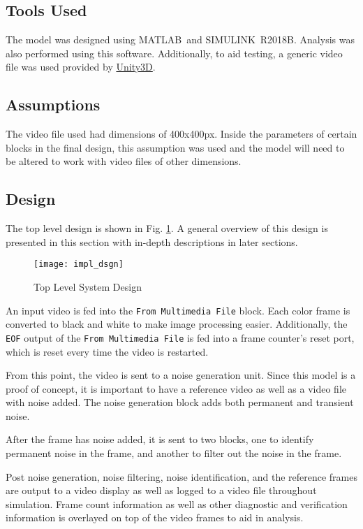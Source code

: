 \subsection{Tools Used}
The model was designed using MATLAB\textregisteredmark\ and SIMULINK\textregisteredmark\ R2018B. Analysis was also performed using this software. Additionally, to aid testing, a generic video file was used provided by \hyperlink{https://blogs.unity3d.com/2016/11/28/free-vfx-image-sequences-flipbooks/}{Unity3D}.
\subsection{Assumptions}
The video file used had dimensions of 400x400px. Inside the parameters of certain blocks in the final design, this assumption was used and the model will need to be altered to work with video files of other dimensions.
\subsection{Design}
The top level design is shown in Fig. \ref{fig:sysSpecs}. A general overview of this design is presented in this section with in-depth descriptions in later sections.
\begin{figure}[H]
    \texttt{[image: impl\_dsgn]}
    \caption{Top Level System Design}
    \label{fig:sysSpecs}
\end{figure}
\par An input video is fed into the \verb!From Multimedia File! block. Each color frame is converted to black and white to make image processing easier. Additionally, the \verb!EOF! output of the \verb!From Multimedia File! is fed into a frame counter's reset port, which is reset every time the video is restarted.
\par From this point, the video is sent to a noise generation unit. Since this model is a proof of concept, it is important to have a reference video as well as a video file with noise added. The noise generation block adds both permanent and transient noise.
\par After the frame has noise added, it is sent to two blocks, one to identify permanent noise in the frame, and another to filter out the noise in the frame.
\par Post noise generation, noise filtering, noise identification, and the reference frames are output to a video display as well as logged to a video file throughout simulation. Frame count information as well as other diagnostic and verification information is overlayed on top of the video frames to aid in analysis.